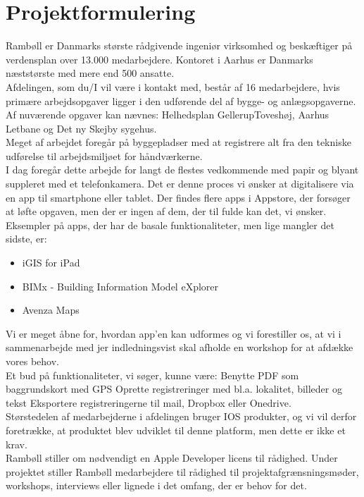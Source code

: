 
	\chapter{Projektformulering}

Rambøll er Danmarks største rådgivende ingeniør virksomhed og beskæftiger på verdensplan over 13.000
medarbejdere. Kontoret i Aarhus er Danmarks næststørste med mere end 500 ansatte.\\
Afdelingen, som du/I vil være i kontakt med, består af 16 medarbejdere, hvis primære arbejdsopgaver ligger i
den udførende del af bygge- og anlægsopgaverne. Af nuværende opgaver kan nævnes: Helhedsplan GellerupToveshøj,
Aarhus Letbane og Det ny Skejby sygehus.\\
Meget af arbejdet foregår på byggepladser med at registrere alt fra den tekniske udførelse til arbejdsmiljøet for
håndværkerne.\\
I dag foregår dette arbejde for langt de flestes vedkommende med papir og blyant suppleret med et
telefonkamera.
Det er denne proces vi ønsker at digitalisere via en app til smartphone eller tablet.
Der findes flere apps i Appstore, der forsøger at løfte opgaven, men der er ingen af dem, der til fulde kan det, vi
ønsker. Eksempler på apps, der har de basale funktionaliteter, men lige mangler det sidste, er:
\begin{itemize}[-]
	\item iGIS for iPad 
	\item BIMx - Building Information Model eXplorer
	\item Avenza Maps
\end{itemize}

Vi er meget åbne for, hvordan app’en kan udformes og vi forestiller os, at vi i sammenarbejde med jer indledningsvist skal afholde en workshop for at afdække vores behov.\\
Et bud på funktionaliteter, vi søger, kunne være:
Benytte PDF som baggrundskort med GPS
Oprette registreringer med bl.a. lokalitet, billeder og tekst
Eksportere registreringerne til mail, Dropbox eller Onedrive.\\
Størstedelen af medarbejderne i afdelingen bruger IOS produkter, og vi vil derfor foretrække, at produktet blev
udviklet til denne platform, men dette er ikke et krav. \\
Rambøll stiller om nødvendigt en Apple Developer licens til rådighed.
Under projektet stiller Rambøll medarbejdere til rådighed til projektafgrænsningsmøder, workshops, interviews
eller lignede i det omfang, der er behov for det. 